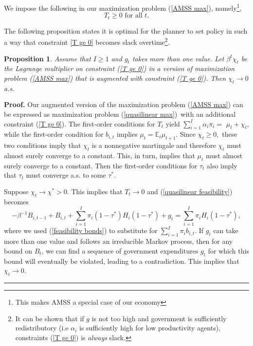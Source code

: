 \documentclass[thmsb,11pt]{article}
\newtheorem{proposition}{Proposition}
\newenvironment{proof}[1][Proof]{\noindent \textbf{#1.} }{\  \rule{0.5em}{0.5em}}
\begin{document}
We impose  the following in our maximization problem (\ref{AMSS max}), namely\footnote{This makes AMSS a special case of our economy },
\begin{equation}
T_{t}\geq 0\text{ for all }t.  \label{T ge 0}
\end{equation}%


The following proposition states it is optimal for the planner to set policy in such a way that constraint \eqref{T ge 0} becomes slack overtime\footnote{It can be shown that if $g$ is not too high and government is sufficiently redistributory (i.e $\alpha_i$ is sufficiently high for low productivity agents), constraints (\ref{T ge 0}) is \emph{always} slack.}.
\smallskip
\begin{proposition}\label{prop:AMSS_killer1}
Assume that $I \geq 1$ and $g_t$ takes more than one value. Let $\beta ^{t}\chi _{t}$ be the Lagrange multiplier on constraint (\ref{T
ge 0}) in a version of  maximization problem (\ref{AMSS max}) that is augmented with constraint (\ref{T
ge 0}). Then $\chi _{t}\rightarrow
0 $ a.s.
\end{proposition}

\begin{proof}
\smallskip Our augmented version of the maximization problem (\ref{AMSS max}) can be expressed
as maximization problem (\ref{quasilinear max})\ with an additional
constraint (\ref{T ge 0}). The first-order conditions for $T_{t}$ yield $%
\sum_{i=1}^{I}\alpha _{i}\pi _{i}=$ $\mu _{t}+\chi _{t}$, while the
first-order condition for $b_{i,t}$ implies $\mu _{t}=\mathbb{E}%
_{t}\mu _{t+1}.$ Since $\chi _{t}\geq 0,$ these two conditions imply
that $\chi _{t}$ is a nonnegative martingale and therefore $\chi _{t}$ must
almost surely converge to a constant. This, in turn, implies that $\mu _{t}$ must
almost surely converge to a constant. Then the first-order conditions for $\tau _{t}$
also imply that $\tau _{t}$ must converge a.s. to some $\tau ^{\ast }.$

Suppose $\chi _{t}\rightarrow \chi ^{\ast }>0.$ This implies that $%
T_{t}\rightarrow 0$ and (\ref{quasilinear feasibility}) becomes
\begin{equation*}
-\beta ^{-1}B_{i,t-1}+B_{i,t}+\sum_{i=1}^{I}\pi _{i}\left( 1-\tau ^{\ast
}\right) H_{i}\left( 1-\tau ^{\ast }\right) +g_{t}=\sum_{i=1}^{I}\pi
_{i}H_{i}\left( 1-\tau ^{\ast }\right) ,
\end{equation*}%
where we used (\ref{feasibility bonds}) to substitute for $\sum_{i=1}^{I}\pi
_{i}b_{i,t}.$ If $g_{t}$ can take more than one value and follows an irreducible
Markov process, then for any bound on $B_{t}$, we can find a sequence of
government expenditures $g_{t}$ for which this bound will eventually be
violated, leading to a contradiction. This implies that $\chi
_{t}\rightarrow 0.$
\end{proof}
\end{document}
